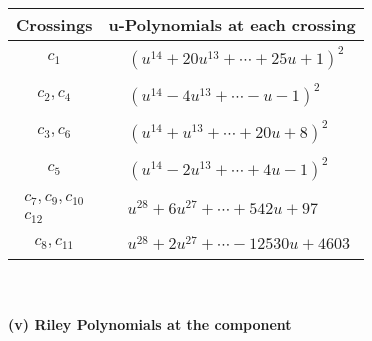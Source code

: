\documentclass[1p]{elsarticle_modified}
\theoremstyle{definition}
\begin{document}
\begin{tabular}{m{50pt}|m{274pt}}
Crossings & \hspace{64pt}u-Polynomials at each crossing \\
\hline $$\begin{aligned}c_{1}\end{aligned}$$&$\begin{aligned}
&(u^{14}+20 u^{13}+\cdots+25 u+1)^{2}
\end{aligned}$\\
\hline $$\begin{aligned}c_{2},c_{4}\end{aligned}$$&$\begin{aligned}
&(u^{14}-4 u^{13}+\cdots- u-1)^{2}
\end{aligned}$\\
\hline $$\begin{aligned}c_{3},c_{6}\end{aligned}$$&$\begin{aligned}
&(u^{14}+u^{13}+\cdots+20 u+8)^{2}
\end{aligned}$\\
\hline $$\begin{aligned}c_{5}\end{aligned}$$&$\begin{aligned}
&(u^{14}-2 u^{13}+\cdots+4 u-1)^{2}
\end{aligned}$\\
\hline $$\begin{aligned}c_{7},c_{9},c_{10}\\c_{12}\end{aligned}$$&$\begin{aligned}
&u^{28}+6 u^{27}+\cdots+542 u+97
\end{aligned}$\\
\hline $$\begin{aligned}c_{8},c_{11}\end{aligned}$$&$\begin{aligned}
&u^{28}+2 u^{27}+\cdots-12530 u+4603
\end{aligned}$\\
\hline
\end{tabular}\\~\\
\newpage\renewcommand{\arraystretch}{1}
\flushleft \textbf{(v) Riley Polynomials at the component}\newline \\
\end{document}
